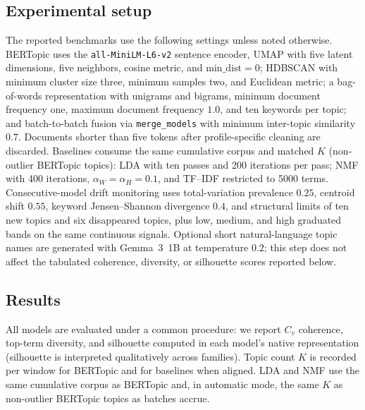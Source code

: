 \documentclass[conference]{IEEEtran}
\newcommand{\bertopic}{BERTopic\xspace}
\newcommand{\lda}{LDA\xspace}
\newcommand{\nmf}{NMF\xspace}
\begin{document}
\subsection{Experimental setup}
The reported benchmarks use the following settings unless noted otherwise. \bertopic uses the \texttt{all-MiniLM-L6-v2} sentence encoder, UMAP with five latent dimensions, five neighbors, cosine metric, and $\mathrm{min\_dist}=0$; HDBSCAN with minimum cluster size three, minimum samples two, and Euclidean metric; a bag-of-words representation with unigrams and bigrams, minimum document frequency one, maximum document frequency $1.0$, and ten keywords per topic; and batch-to-batch fusion via \texttt{merge\_models} with minimum inter-topic similarity $0.7$. Documents shorter than five tokens after profile-specific cleaning are discarded. Baselines consume the same cumulative corpus and matched $K$ (non-outlier \bertopic topics): LDA with ten passes and 200 iterations per pass; NMF with 400 iterations, $\alpha_W=\alpha_H=0.1$, and TF--IDF restricted to 5000 terms. Consecutive-model drift monitoring uses total-variation prevalence $0.25$, centroid shift $0.55$, keyword Jensen--Shannon divergence $0.4$, and structural limits of ten new topics and six disappeared topics, plus low, medium, and high graduated bands on the same continuous signals. Optional short natural-language topic names are generated with Gemma~3~1B at temperature $0.2$; this step does not affect the tabulated coherence, diversity, or silhouette scores reported below.

\subsection{Results}
All models are evaluated under a common procedure: we report $C_v$ coherence, top-term diversity, and silhouette computed in each model's native representation (silhouette is interpreted qualitatively across families). Topic count $K$ is recorded per window for \bertopic and for baselines when aligned. \lda and \nmf use the same cumulative corpus as \bertopic and, in automatic mode, the same $K$ as non-outlier \bertopic topics as batches accrue.
\end{document}

